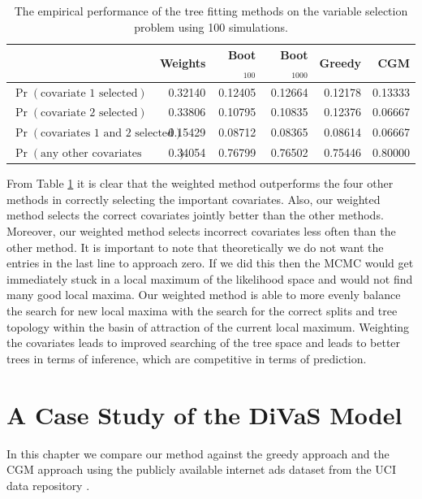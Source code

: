 
\begin{table}[ht]
\begin{center}
\begin{tabular}{l | rrrrr}
  \hline
  & Weights & Boot$_{100}$ & Boot$_{1000}$ & Greedy & CGM \\ 
  \hline
$\Pr(\text{covariate 1 selected})$ & 0.32140 & 0.12405 & 0.12664 & 0.12178 & 0.13333 \\ 
$\Pr(\text{covariate 2 selected})$ & 0.33806 & 0.10795 & 0.10835 & 0.12376 & 0.06667 \\ 
  $\Pr(\text{covariates 1 and 2 selected})$& 0.15429 & 0.08712 & 0.08365 & 0.08614 & 0.06667 \\ 
  $\Pr(\text{any other covariates  selected})$ & 0.34054 & 0.76799 & 0.76502 & 0.75446 & 0.80000 \\ 
   \hline
\end{tabular}
 \caption[Empirical covariate selection with 100 simulations]{The empirical performance of the tree fitting methods on the variable selection problem using 100 simulations.}
 \label{tab:sim_study}
 \end{center}
\end{table}


From Table \ref{tab:sim_study} it is clear that the weighted method outperforms the four other methods in correctly selecting the important covariates. Also, our weighted method selects the correct covariates jointly better than the other methods. Moreover, our weighted method selects incorrect covariates less often than the other method. It is important to note that theoretically we do not want the entries in the last line to approach zero. If we did this then the MCMC would get immediately stuck in a local maximum of the likelihood space and would not find many good local maxima. Our weighted method is able to more evenly balance the search for new local maxima with the search for the correct splits and tree topology within the basin of attraction of the current local maximum. Weighting the covariates leads to improved searching of the tree space and leads to better trees in terms of inference, which are competitive in terms of prediction.  

\newpage

\chapter{A Case Study of the DiVaS Model}\label{sec:real_data}
In this chapter we compare our method against the greedy approach and the CGM approach using the publicly available internet ads dataset from the UCI data repository \cite{Frank:2010uq}. 

